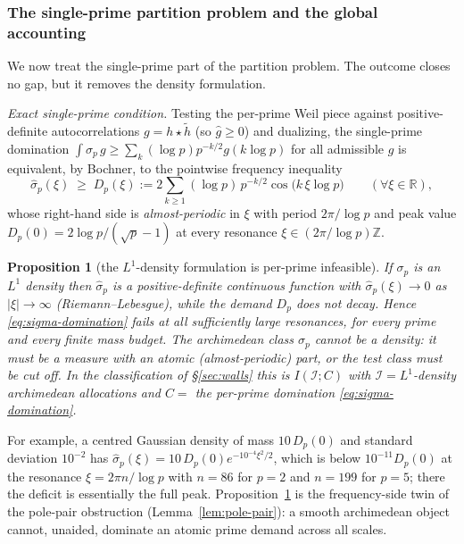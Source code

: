 \documentclass[11pt]{amsart}
\newtheorem{proposition}[theorem]{Proposition}
\theoremstyle{definition}
\theoremstyle{remark}
\theoremstyle{definition}
\newcommand{\R}{\mathbb{R}}
\newcommand{\Z}{\mathbb{Z}}
\begin{document}
\subsubsection*{The single-prime partition problem and the global accounting}

We now treat the single-prime part of the partition problem.  The outcome closes no gap, but it removes
the density formulation.

\emph{Exact single-prime condition.}  Testing the per-prime Weil piece against positive-definite
autocorrelations $g=h\star\tilde h$ (so $\hat g\ge0$) and dualizing, the single-prime domination
$\int\sigma_p\,g\ge\sum_k(\log p)p^{-k/2}g(k\log p)$ for all admissible $g$ is equivalent, by Bochner,
to the pointwise frequency inequality
\begin{equation}\label{eq:sigma-domination}
   \hat\sigma_p(\xi)\;\ge\;D_p(\xi):=2\sum_{k\ge1}(\log p)\,p^{-k/2}\cos\!\big(k\,\xi\log p\big)
   \qquad(\forall\xi\in\R),
\end{equation}
whose right-hand side is \emph{almost-periodic} in $\xi$ with period $2\pi/\log p$ and peak value
$D_p(0)=2\log p/(\sqrt p-1)$ at every resonance $\xi\in(2\pi/\log p)\Z$.

\begin{proposition}[the $L^1$-density formulation is per-prime infeasible]\label{prop:W5}
If $\sigma_p$ is an $L^1$ density then $\hat\sigma_p$ is a positive-definite continuous function with
$\hat\sigma_p(\xi)\to0$ as $|\xi|\to\infty$ (Riemann--Lebesgue), while the demand $D_p$ does not decay.
Hence \eqref{eq:sigma-domination} fails at all sufficiently large resonances, for \emph{every} prime and
\emph{every} finite mass budget.  The archimedean class $\sigma_p$ cannot be a density: it must be a
measure with an atomic (almost-periodic) part, or the test class must be cut off.  In the classification
of \S\ref{sec:walls} this is $I(\mathcal I;C)$ with $\mathcal I=L^1$-density archimedean allocations and
$C=$ the per-prime domination \eqref{eq:sigma-domination}.
\end{proposition}
\noindent For example, a centred Gaussian density of mass $10\,D_p(0)$ and standard deviation $10^{-2}$
has $\hat\sigma_p(\xi)=10\,D_p(0)e^{-10^{-4}\xi^2/2}$, which is below $10^{-11}D_p(0)$ at the resonance
$\xi=2\pi n/\log p$ with $n=86$ for $p=2$ and $n=199$ for $p=5$; there the deficit is essentially the
full peak.  Proposition~\ref{prop:W5} is the frequency-side twin of the pole-pair obstruction
(Lemma~\ref{lem:pole-pair}): a smooth archimedean object cannot, unaided, dominate an atomic prime
demand across all scales.
\end{document}
